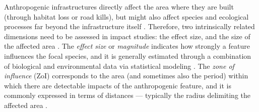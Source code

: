 \documentclass[titlepage]{article}
\begin{document}
Anthropogenic infrastructures directly affect the area where they are built (through habitat loss or road kills), but might also affect species and ecological processes far beyond the infrastructure itself \citep[ by causing avoidance responses, and thus reducing the probability of animal occurrence in its proximity;][]{johnson_cumulative_2005,torres_assessing_2016; Dorber et al, submitted}. Therefore, two intrinsically related dimensions need to be assessed in impact studies: the effect size, and the size of the affected area \citep[Box 1; ][]{naugle_unifying_2011}. The \textit{effect size} or \textit{magnitude} indicates how strongly a feature influences the focal species, and it is generally estimated through a combination of biological and environmental data via statistical modeling \citep[Box 1;][]{polfus_identifying_2011}. The \textit{zone of influence} (ZoI) corresponds to the area (and sometimes also the period) within which there are detectable impacts of the anthropogenic feature, and it is commonly expressed in terms of distances --- typically the radius delimiting the affected area \citep[Box 1;][]{ boulanger_estimating_2012}. 
\end{document}

